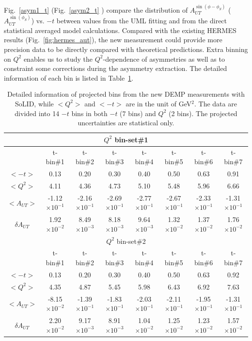 Fig.~\ref{asym1_t} (Fig.~\ref{asym2_t} ) compare the distribution of
$A_{UT}^{\sin(\phi-\phi_{S})} $ ($A_{UT}^{\sin(\phi_{S})}$) vs. $-t$ between
values from the UML fitting and from the direct statistical averaged model
calculations.  Compared with the existing HERMES results
(Fig.~\ref{fig:hermes_aut}), the new measurement could provide more precision
data to be directly compared with theoretical predictions. Extra binning on
$Q^{2}$ enables us to study the $Q^{2}$-dependence of asymmetries as well as to
constraint some corrections during the asymmetry extraction.  The detailed
information of each bin is listed in Table~\ref{asym_bin_table}.
\begin{table}[!ht]
\centering
 \small
\begin{tabular}{|c|c|c|c|c|c|c|c|}
\hline
 \multicolumn{8}{|c|}{$Q^{2}$ bin-set\#1 } \\
\hline
      &  t-bin\#1 & t-bin\#2 & t-bin\#3 & t-bin\#4 & t-bin\#5 & t-bin\#6 & t-bin\#7 \\
  \hline
$<-t>$    &  0.13 &  0.20 & 0.30 & 0.40 & 0.50 & 0.63 & 0.91 \\
$<Q^{2}>$   &  4.11 &  4.36 & 4.73 & 5.10 & 5.48 & 5.96 & 6.66 \\
$<A_{UT}>$ &  -1.12$\times 10^{-1}$ &  -2.16$\times 10^{-1}$ & -2.69$\times 10^{-1}$ & -2.77$\times 10^{-1}$ & -2.67$\times 10^{-1}$ & -2.33$\times 10^{-1}$ & -1.31$\times 10^{-1}$ \\
$\delta A_{UT}$  &  1.92$\times 10^{-2}$ &  8.49$\times 10^{-3}$ & 8.18$\times 10^{-3}$ & 9.64$\times 10^{-3}$ & 1.32$\times 10^{-2}$ & 1.37$\times 10^{-2}$ & 1.76$\times 10^{-2}$ \\
\hline

\multicolumn{8}{|c|}{$Q^{2}$ bin-set\#2 } \\
\hline
      &  t-bin\#1 & t-bin\#2 & t-bin\#3 & t-bin\#4 & t-bin\#5 & t-bin\#6 & t-bin\#7 \\
  \hline
$<-t>$     &  0.13 &  0.20 & 0.30 & 0.40 & 0.50 & 0.63 & 0.92 \\
$<Q^{2}>$   &  4.35 &  4.87 & 5.45 & 5.98 & 6.43 & 6.92 & 7.63 \\
$<A_{UT}>$   &  -8.15$\times 10^{-2}$ &  -1.39$\times 10^{-1}$ & -1.83$\times 10^{-1}$ & -2.03$\times 10^{-1}$ & -2.11$\times 10^{-1}$ & -1.95$\times 10^{-1}$ & -1.31$\times 10^{-1}$ \\
$\delta A_{UT}$   &  2.20$\times 10^{-2}$ &  9.17$\times 10^{-3}$ & 8.91$\times 10^{-3}$ & 1.04$\times 10^{-2}$ & 1.25$\times 10^{-2}$ & 1.23$\times 10^{-2}$ & 1.57$\times 10^{-2}$ \\
\hline
\end{tabular}
\caption[Detailed information of projected bins]{\footnotesize{Detailed
    information of projected bins from the new DEMP measurements with SoLID,
    while $<Q^{2}>$ and $<-t>$ are in the unit of GeV$^{2}$. The data are
    divided into 14 $-t$ bins in both $-t$ (7 bins) and $Q^{2}$ (2 bins).  The
    projected uncertainties are statistical only.}}
\label{asym_bin_table}
\end{table} 

